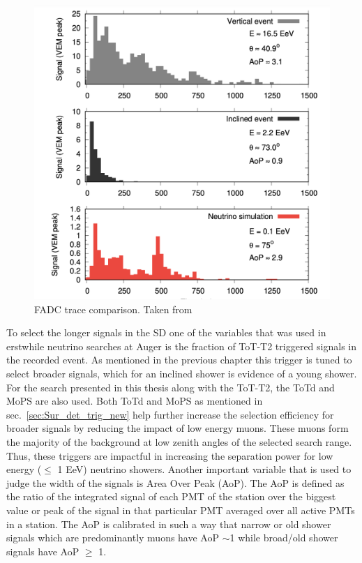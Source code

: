 \begin{figure}[t!]
  \centering
  \includegraphics[width=14.5cm]{thesis_figures/Nu_analysis/Signal_trace_comp.png}
  \caption{FADC trace comparison. Taken from~\cite{}}
  \label{fig:Signal_trace_comp}
\end{figure}

To select the longer signals in the SD one of the variables that was used in erstwhile neutrino searches at Auger is the fraction of ToT-T2 triggered signals in the recorded event. As mentioned in the previous chapter this trigger is tuned to select broader signals, which for an inclined shower is evidence of a young shower. For the search presented in this thesis along with the ToT-T2, the ToTd and MoPS are also used. Both ToTd and MoPS as mentioned in sec.~\ref{sec:Sur_det_trig_new} help further increase the selection efficiency for broader signals by reducing the impact of low energy muons. These muons form the majority of the background at low zenith angles of the selected search range. Thus, these triggers are impactful in increasing the separation power for low energy ($\leq$ 1 EeV) neutrino showers. Another important variable that is used to judge the width of the signals is Area Over Peak (AoP). The AoP is defined as the ratio of the integrated signal of each PMT of the station over the biggest value or peak of the signal in that particular PMT averaged over all active PMTs in a station. The AoP is calibrated in such a way that narrow or old shower signals which are predominantly muons have AoP $\sim$1 while broad/old shower signals have AoP $\geqslant$ 1. 

